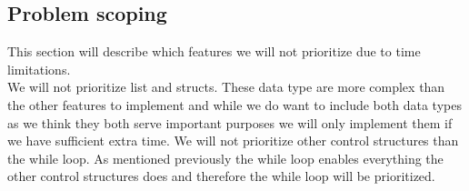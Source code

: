 \subsection{Problem scoping}
This section will describe which features we will not prioritize due to time limitations.\\
We will not prioritize list and structs. These data type are more complex than the other features to implement and while we do want to include both data types as we think they both serve important purposes we will only implement them if we have sufficient extra time.
We will not prioritize other control structures than the while loop. As mentioned previously the while loop enables everything the other control structures does and therefore the while loop will be prioritized.

\\



